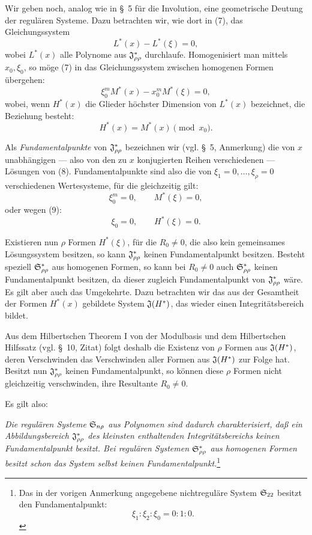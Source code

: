 Wir geben noch, analog wie in \S\ 5 für die Involution, eine geometrische Deutung der regulären Systeme. Dazu betrachten wir, wie dort in (7), das Gleichungssystem
\begin{equation}
  L^*(x)-L^*(\xi)=0,
\tag{7}
\end{equation}
wobei $L^*(x)$ alle Polynome aus $\mathfrak{J}^*_{\rho\rho}$ durchlaufe. Homogenisiert man mittels $x_0,
\xi_0$, so möge (7) in das Gleichungssystem zwischen homogenen Formen übergehen:
\begin{equation}
  \xi_0^{m}M^*(x)-x_0^{m}M^*(\xi)=0,
\tag{8}
\end{equation}
wobei, wenn $H^*(x)$ die Glieder höchster Dimension von $L^*(x)$ bezeichnet, die Beziehung besteht:
\begin{equation}
  H^*(x)=M^*(x)\pmod{x_0}.
\tag{9}
\end{equation}

Als \emph{Fundamentalpunkte} von $\mathfrak{J}^*_{\rho\rho}$ bezeichnen wir (vgl. \S\ 5, Anmerkung) die von $x$ unabhängigen --- also von den zu $x$ konjugierten Reihen verschiedenen --- Lösungen von (8). Fundamentalpunkte sind also die von $\xi_1=0,
\ldots,
\xi_\rho=0$ verschiedenen Wertesysteme, für die gleichzeitig gilt:
\[
  \xi_0^m=0,\qquad M^*(\xi)=0,
\]
oder wegen (9):
\[
  \xi_0=0,
  \qquad H^*(\xi)=0.
\]

Existieren nun $\rho$ Formen $H^*(\xi)$, für die $R_0\ne0$, die also kein gemeinsames Lösungssystem besitzen, so kann $\mathfrak{J}^*_{\rho\rho}$ keinen Fundamentalpunkt besitzen. Besteht speziell $\mathfrak{S}^*_{\rho\rho}$ aus homogenen Formen, so kann bei $R_0\ne0$ auch $\mathfrak{S}^*_{\rho\rho}$ keinen Fundamentalpunkt besitzen, da dieser zugleich Fundamentalpunkt von $\mathfrak{J}^*_{\rho\rho}$ wäre. Es gilt aber auch das Umgekehrte. Dazu betrachten wir das aus der Gesamtheit der Formen $H^*(x)$ gebildete System $\mathfrak{J}(H^*)$, das wieder einen Integritätsbereich bildet.

Aus dem Hilbertschen Theorem I von der Modulbasis und dem Hilbertschen Hilfssatz (vgl. \S\ 10, Zitat) folgt deshalb die Existenz von $\rho$ Formen aus $\mathfrak{J}(H^*)$, deren Verschwinden das Verschwinden aller Formen aus $\mathfrak{J}(H^*)$ zur Folge hat. Besitzt nun $\mathfrak{J}^*_{\rho\rho}$ keinen Fundamentalpunkt, so können diese $\rho$ Formen nicht gleichzeitig verschwinden, ihre Resultante $R_0\ne0$.

Es gilt also:

\emph{Die regulären Systeme $\mathfrak{S}_{n\rho}$ aus Polynomen sind dadurch charakterisiert, daß ein Abbildungsbereich $\mathfrak{J}^*_{\rho\rho}$ des kleinsten enthaltenden Integritätsbereichs keinen Fundamentalpunkt besitzt. Bei regulären Systemen $\mathfrak{S}^*_{\rho\rho}$ aus homogenen Formen besitzt schon das System selbst keinen Fundamentalpunkt.}\footnote{Das in der vorigen Anmerkung angegebene nichtreguläre System $\mathfrak{S}_{22}$ besitzt den Fundamentalpunkt:
\[
  \xi_1:\xi_2:\xi_0=0:1:0.
\]}

